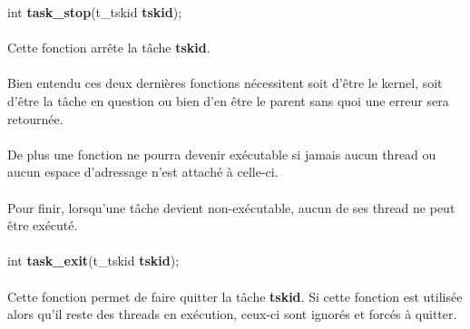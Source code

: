 \documentclass[10pt,a4wide]{article}
\begin{document}
\hspace{1.5cm}int \textbf{task\_stop}(t\_tskid \textbf{tskid});

\paragraph{}

Cette fonction arr\^ete la t\^ache \textbf{tskid}.

\paragraph{}

Bien entendu ces deux derni\`eres fonctions n\'ecessitent soit
d'\^etre le kernel, soit d'\^etre la t\^ache en question ou bien d'en
\^etre le parent sans quoi une erreur sera retourn\'ee.

\paragraph{}

De plus une fonction ne pourra devenir ex\'ecutable si jamais aucun
thread ou aucun espace d'adressage n'est attach\'e \`a celle-ci.

\paragraph{}

Pour finir, lorsqu'une t\^ache devient non-ex\'ecutable, aucun de ses
thread ne peut \^etre ex\'ecut\'e.

\paragraph{}

\hspace{1.5cm}int \textbf{task\_exit}(t\_tskid \textbf{tskid});

\paragraph{}

Cette fonction permet de faire quitter la t\^ache \textbf{tskid}.
Si cette fonction est utilis\'ee alors qu'il reste des threads
en ex\'ecution, ceux-ci sont ignor\'es et forc\'es \`a quitter.

\paragraph{}
\end{document}
